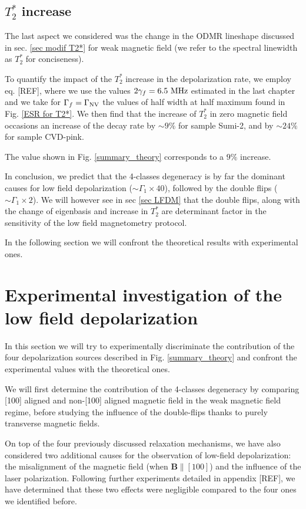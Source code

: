\documentclass[a4paper,11pt]{report}
\begin{document}
\subsection{$T_2^*$ increase}

The last aspect we considered was the change in the ODMR lineshape discussed in sec. \ref{sec modif T2*} for weak magnetic field (we refer to the spectral linewidth as $T_2^*$ for conciseness).

To quantify the impact of the $T_2^*$ increase in the depolarization rate, we employ eq. [REF], where we use the values $2\gamma_f = 6.5\ \rm MHz$ estimated in the last chapter and we take for $\Gamma_f=\Gamma_{\rm NV}$ the values of half width at half maximum found in Fig. \ref{ESR for T2*}. We then find that the increase of $T_2^*$ in zero magnetic field occasions an increase of the decay rate by $\sim 9 \%$ for sample Sumi-2, and by $\sim 24 \%$ for sample CVD-pink. 

The value shown in Fig. \ref{summary_theory} corresponds to a $9 \%$ increase.

\bigskip

In conclusion, we predict that the 4-classes degeneracy is by far the dominant causes for low field depolarization ($\sim \Gamma_1 \times 40$), followed by the double flips ($\sim \Gamma_1 \times 2$). We will however see in sec \ref{sec LFDM} that the double flips, along with the change of eigenbasis and increase in $T_2^*$ are determinant factor in the sensitivity of the low field magnetometry protocol.

In the following section we will confront the theoretical results with experimental ones.

\section{Experimental investigation of the low field depolarization}
\label{sec 4.3}
In this section we will try to experimentally discriminate the contribution of the four depolarization sources described in Fig. \ref{summary_theory} and confront the experimental values with the theoretical ones. 

We will first determine the contribution of the 4-classes degeneracy by comparing [100] aligned and non-[100] aligned magnetic field in the weak magnetic field regime, before studying the influence of the double-flips thanks to purely transverse magnetic fields.

On top of the four previously discussed relaxation mechanisms, we have also considered two additional causes for the observation of low-field depolarization: the misalignment of the magnetic field (when $\mathbf{B}\parallel [100]$) and the influence of the laser polarization. Following further experiments detailed in appendix [REF], we have determined that these two effects were negligible compared to the four ones we identified before.
\end{document}
